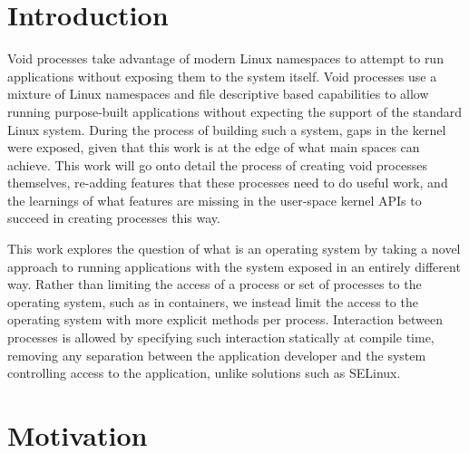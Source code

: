 \documentclass[sigplan]{acmart}
\begin{document}



\maketitle

\section{Introduction}

Void processes take advantage of modern Linux namespaces to attempt to run applications without exposing them to the system itself. Void processes use a mixture of Linux namespaces and file descriptive based capabilities to allow running purpose-built applications without expecting the support of the standard Linux system. During the process of building such a system, gaps in the kernel were exposed, given that this work is at the edge of what main spaces can achieve. This work will go onto detail the process of creating void processes themselves, re-adding features that these processes need to do useful work, and the learnings of what features are missing in the user-space kernel APIs to succeed in creating processes this way.

This work explores the question of what is an operating system by taking a novel approach to running applications with the system exposed in an entirely different way. Rather than limiting the access of a process or set of processes to the operating system, such as in containers, we instead limit the access to the operating system with more explicit methods per process. Interaction between processes is allowed by specifying such interaction statically at compile time, removing any separation between the application developer and the system controlling access to the application, unlike solutions such as SELinux.

\section{Motivation}
\end{document}
